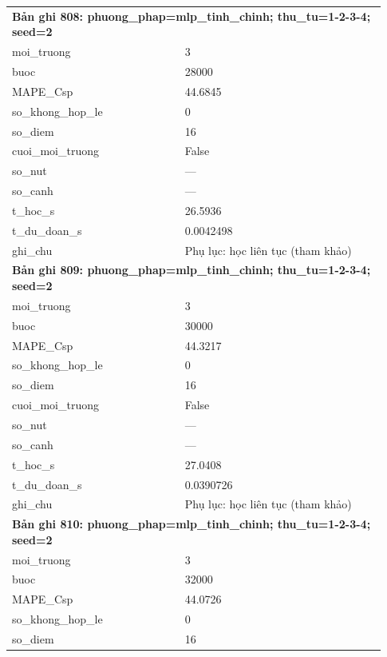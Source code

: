 \begin{longtable}{p{0.43\linewidth}p{0.50\linewidth}}
\midrule
\multicolumn{2}{p{0.95\linewidth}}{\textbf{Bản ghi 808: phuong\_phap=mlp\_tinh\_chinh; thu\_tu=1-2-3-4; seed=2}} \\
moi\_\allowbreak truong & 3 \\
buoc & 28000 \\
MAPE\_\allowbreak Csp & 44.6845 \\
so\_\allowbreak khong\_\allowbreak hop\_\allowbreak le & 0 \\
so\_\allowbreak diem & 16 \\
cuoi\_\allowbreak moi\_\allowbreak truong & False \\
so\_\allowbreak nut & — \\
so\_\allowbreak canh & — \\
t\_\allowbreak hoc\_\allowbreak s & 26.5936 \\
t\_\allowbreak du\_\allowbreak doan\_\allowbreak s & 0.0042498 \\
ghi\_\allowbreak chu & Phụ lục: học liên tục (tham khảo) \\
\midrule
\multicolumn{2}{p{0.95\linewidth}}{\textbf{Bản ghi 809: phuong\_phap=mlp\_tinh\_chinh; thu\_tu=1-2-3-4; seed=2}} \\
moi\_\allowbreak truong & 3 \\
buoc & 30000 \\
MAPE\_\allowbreak Csp & 44.3217 \\
so\_\allowbreak khong\_\allowbreak hop\_\allowbreak le & 0 \\
so\_\allowbreak diem & 16 \\
cuoi\_\allowbreak moi\_\allowbreak truong & False \\
so\_\allowbreak nut & — \\
so\_\allowbreak canh & — \\
t\_\allowbreak hoc\_\allowbreak s & 27.0408 \\
t\_\allowbreak du\_\allowbreak doan\_\allowbreak s & 0.0390726 \\
ghi\_\allowbreak chu & Phụ lục: học liên tục (tham khảo) \\
\midrule
\multicolumn{2}{p{0.95\linewidth}}{\textbf{Bản ghi 810: phuong\_phap=mlp\_tinh\_chinh; thu\_tu=1-2-3-4; seed=2}} \\
moi\_\allowbreak truong & 3 \\
buoc & 32000 \\
MAPE\_\allowbreak Csp & 44.0726 \\
so\_\allowbreak khong\_\allowbreak hop\_\allowbreak le & 0 \\
so\_\allowbreak diem & 16 \\

\end{longtable}
